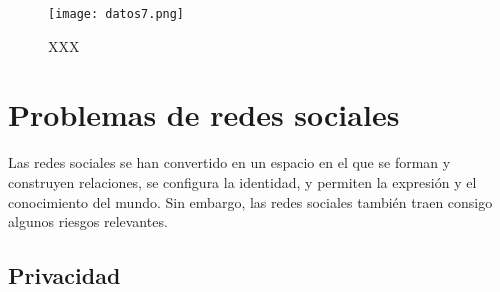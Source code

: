 \begin{figure}[ht!]
    \texttt{[image: datos7.png]}
    \caption{XXX}
    \label{datos7}
\end{figure}

\section{Problemas de redes sociales}

Las redes sociales se han convertido en un espacio en el que se forman y construyen relaciones, se configura la identidad, y permiten la expresión y el conocimiento del mundo. Sin embargo, las redes sociales también traen consigo algunos riesgos relevantes.

\subsection{Privacidad}

